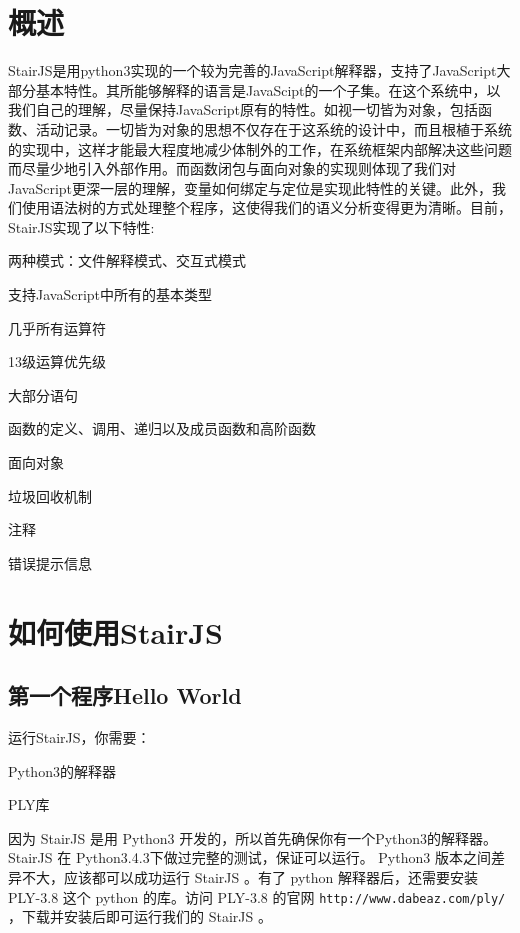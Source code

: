\documentclass[a4paper]{article}
\newcounter{rowno}
\begin{document}
\begin{CJK}{UTF8}{gbsn}
\section{概述}
    StairJS是用python3实现的一个较为完善的JavaScript解释器，支持了JavaScript大部分基本特性。其所能够解释的语言是JavaScipt的一个子集。在这个系统中，以我们自己的理解，尽量保持JavaScript原有的特性。如视一切皆为对象，包括函数、活动记录。一切皆为对象的思想不仅存在于这系统的设计中，而且根植于系统的实现中，这样才能最大程度地减少体制外的工作，在系统框架内部解决这些问题而尽量少地引入外部作用。而函数闭包与面向对象的实现则体现了我们对JavaScript更深一层的理解，变量如何绑定与定位是实现此特性的关键。此外，我们使用语法树的方式处理整个程序，这使得我们的语义分析变得更为清晰。目前，StairJS实现了以下特性:
    \setcounter{rowno}{0}
    \begin{list}{\therowno.}{\setlength{\rightmargin}{\leftmargin}}
        \item 两种模式：文件解释模式、交互式模式 
        \item 支持JavaScript中所有的基本类型 
        \item 几乎所有运算符 
        \item 13级运算优先级 
        \item 大部分语句 
        \item 函数的定义、调用、递归以及成员函数和高阶函数 
        \item 面向对象 
        \item 垃圾回收机制 
        \item 注释 
        \item 错误提示信息
    \end{list}
\section{如何使用StairJS}
    \subsection{第一个程序Hello World}
        运行StairJS，你需要：
        \setcounter{rowno}{0}
        \begin{list}{\therowno.}{\setlength{\rightmargin}{\leftmargin}}
            \item Python3的解释器
            \item PLY库
        \end{list}
        因为 StairJS 是用 Python3 开发的，所以首先确保你有一个Python3的解释器。StairJS 在 Python3.4.3下做过完整的测试，保证可以运行。 Python3 版本之间差异不大，应该都可以成功运行 StairJS 。有了 python 解释器后，还需要安装 PLY-3.8 这个 python 的库。访问 PLY-3.8 的官网 {\tt http://www.dabeaz.com/ply/} ，下载并安装后即可运行我们的 StairJS 。\\


\end{CJK}
\end{document}
